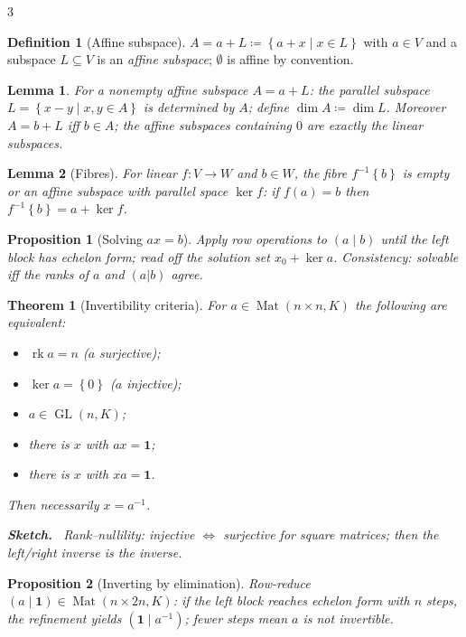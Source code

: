 \documentclass[10pt,a4paper,landscape]{article}
\theoremstyle{definition}
\newtheorem{defn}{Definition}[section]
\theoremstyle{plain}
\newtheorem{thm}{Theorem}[section]
\newtheorem{lem}{Lemma}[section]
\newtheorem{prop}{Proposition}[section]
\theoremstyle{remark}
\newcommand{\set}[1]{\left\{ #1 \right\}}
\newcommand{\deq}{\coloneqq}
\DeclareMathOperator{\Mat}{Mat}
\DeclareMathOperator{\GL}{GL}
\DeclareMathOperator{\rk}{rk}
\newcommand{\one}{\mathbf{1}}
\newenvironment{proofsketch}{%
  \par\small\color{exgray}\textbf{Sketch.}\ }%
  {\par}
\begin{document}
\begin{multicols*}{3}
\begin{defn}[Affine subspace]
$A = a + L \deq \set{a + x \mid x \in L}$ with $a \in V$ and a subspace $L \subseteq V$ is an \emph{affine subspace}; $\emptyset$ is affine by convention.
\end{defn}

\begin{lem}
For a nonempty affine subspace $A = a + L$: the parallel subspace $L = \set{x - y \mid x, y \in A}$ is determined by $A$; define $\dim A \deq \dim L$. Moreover $A = b + L$ iff $b \in A$; the affine subspaces containing $0$ are exactly the linear subspaces.
\end{lem}

\begin{lem}[Fibres]
For linear $f: V \to W$ and $b \in W$, the fibre $f^{-1}\set{b}$ is empty or an affine subspace with parallel space $\ker f$: if $f(a) = b$ then $f^{-1}\set{b} = a + \ker f$.
\end{lem}

\begin{prop}[Solving $ax = b$]
Apply row operations to $(a \mid b)$ until the left block has echelon form; read off the solution set $x_0 + \ker a$. Consistency: solvable iff the ranks of $a$ and $(a|b)$ agree.
\end{prop}

\begin{thm}[Invertibility criteria]
For $a \in \Mat(n \times n, K)$ the following are equivalent:
\begin{itemize}
\item $\rk a = n$ \quad ($a$ surjective);
\item $\ker a = \set{0}$ \quad ($a$ injective);
\item $a \in \GL(n,K)$;
\item there is $x$ with $ax = \one$; \item there is $x$ with $xa = \one$.
\end{itemize}
Then necessarily $x = a^{-1}$.
\begin{proofsketch}
Rank--nullility: injective $\Leftrightarrow$ surjective for square matrices; then the left/right inverse is the inverse.
\end{proofsketch}
\end{thm}

\begin{prop}[Inverting by elimination]
Row-reduce $(a \mid \one) \in \Mat(n \times 2n, K)$: if the left block reaches echelon form with $n$ steps, the refinement yields $(\one \mid a^{-1})$; fewer steps mean $a$ is not invertible.
\end{prop}


\end{multicols*}
\end{document}
